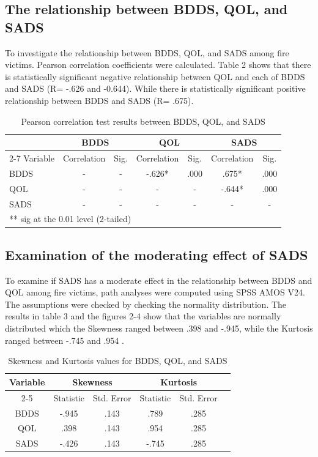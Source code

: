 \documentclass[10pt]{NSP1}
\begin{document}
	\subsection{The relationship between BDDS, QOL, and SADS}
	To investigate the relationship between BDDS, QOL, and SADS among fire victims. Pearson correlation coefficients were calculated. Table 2 shows that there is statistically significant negative relationship between QOL and each of BDDS and SADS (R= -.626 and -0.644). While there is statistically significant positive relationship between BDDS and SADS (R= .675).
	
	\begin{table}[H]
		\centering
		\caption{Pearson correlation test results between BDDS, QOL, and SADS}
		\label{tab:correlation}
		\vspace{5pt}
		\small
		\begin{tabular}{l|cc|cc|cc}
			\hline
			& \multicolumn{2}{c|}{BDDS} & \multicolumn{2}{c|}{QOL} & \multicolumn{2}{c}{SADS} \\
			\cline{2-7}
			Variable & Correlation & Sig. & Correlation & Sig. & Correlation & Sig. \\
			\hline
			BDDS & - & - & -.626* & .000 & .675* & .000 \\
			QOL & - & - & - & - & -.644* & .000 \\
			SADS & - & - & - & - & - & - \\
			\hline
			\multicolumn{7}{l}{** sig at the 0.01 level (2-tailed)} \\
		\end{tabular}
	\end{table}
	
	\subsection{Examination of the moderating effect of SADS}
	To examine if SADS has a moderate effect in the relationship between BDDS and QOL among fire victims, path analyses were computed using SPSS AMOS V24. The assumptions were checked by checking the normality distribution. The results in table 3 and the figures 2-4 show that the variables are normally distributed which the Skewness ranged between .398 and -.945, while the Kurtosis ranged between -.745 and .954 \cite{Hair2018}.
	
	\begin{table}[H]
		\centering
		\caption{Skewness and Kurtosis values for BDDS, QOL, and SADS}
		\label{tab:normality}
		\vspace{5pt}
		\small
		\begin{tabular}{cccccc}
			\hline
			Variable & \multicolumn{2}{c}{Skewness} & \multicolumn{2}{c}{Kurtosis} \\
			\cline{2-5}
			& Statistic & Std. Error & Statistic & Std. Error \\
			\hline
			BDDS & -.945 & .143 & .789 & .285 \\
			QOL & .398 & .143 & .954 & .285 \\
			SADS & -.426 & .143 & -.745 & .285 \\
			\hline
		\end{tabular}
	\end{table}
	
\end{document}
